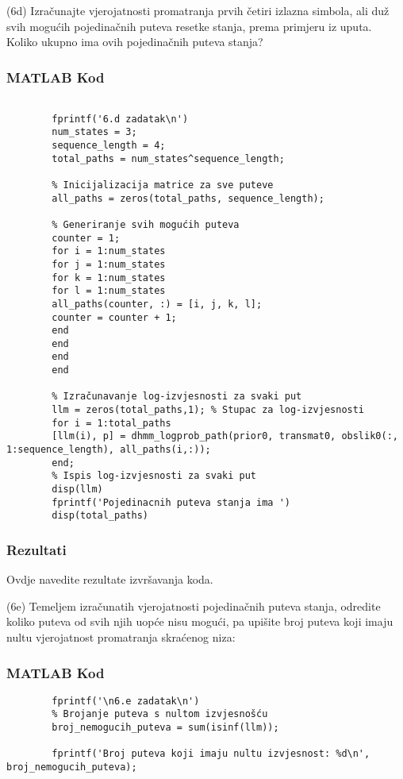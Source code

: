 \documentclass[12pt]{article}
\begin{document}
	(6d) Izračunajte vjerojatnosti promatranja prvih četiri izlazna simbola, ali duž svih mogućih pojedinačnih puteva resetke stanja, prema primjeru iz uputa. Koliko ukupno ima ovih pojedinačnih puteva stanja?
	\subsubsection*{MATLAB Kod}
	\begin{lstlisting}
		
		fprintf('6.d zadatak\n')
		num_states = 3;     
		sequence_length = 4;
		total_paths = num_states^sequence_length;
		
		% Inicijalizacija matrice za sve puteve
		all_paths = zeros(total_paths, sequence_length);
		
		% Generiranje svih mogućih puteva
		counter = 1;
		for i = 1:num_states
		for j = 1:num_states
		for k = 1:num_states
		for l = 1:num_states
		all_paths(counter, :) = [i, j, k, l];
		counter = counter + 1;
		end
		end
		end
		end
		
		% Izračunavanje log-izvjesnosti za svaki put
		llm = zeros(total_paths,1); % Stupac za log-izvjesnosti
		for i = 1:total_paths
		[llm(i), p] = dhmm_logprob_path(prior0, transmat0, obslik0(:, 1:sequence_length), all_paths(i,:));
		end;
		% Ispis log-izvjesnosti za svaki put
		disp(llm)
		fprintf('Pojedinacnih puteva stanja ima ')
		disp(total_paths)
	\end{lstlisting}
	
	\subsubsection*{Rezultati}
	Ovdje navedite rezultate izvršavanja koda.\newline
	
	
	(6e) Temeljem izračunatih vjerojatnosti pojedinačnih puteva stanja, odredite koliko puteva od svih njih uopće nisu mogući, pa upišite broj puteva koji imaju nultu vjerojatnost promatranja skraćenog niza:
	\subsubsection*{MATLAB Kod}
	\begin{lstlisting}
		fprintf('\n6.e zadatak\n')
		% Brojanje puteva s nultom izvjesnošću
		broj_nemogucih_puteva = sum(isinf(llm));
		
		fprintf('Broj puteva koji imaju nultu izvjesnost: %d\n', broj_nemogucih_puteva);
	\end{lstlisting}
	
\end{document}
